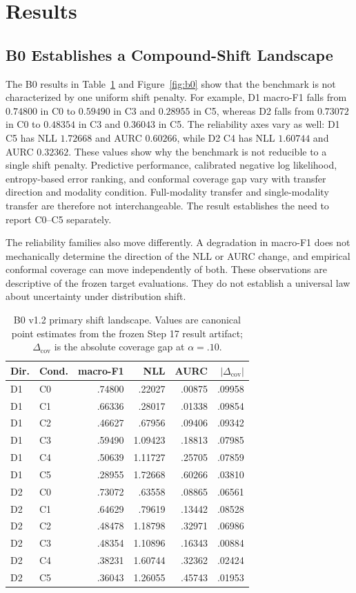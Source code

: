 \documentclass[11pt]{article}
\begin{document}
\section{Results}
\subsection{B0 Establishes a Compound-Shift Landscape}
The B0 results in Table~\ref{tab:b0} and Figure~\ref{fig:b0} show that the benchmark is not characterized by one uniform shift penalty. For example, D1 macro-F1 falls from $0.74800$ in C0 to $0.59490$ in C3 and $0.28955$ in C5, whereas D2 falls from $0.73072$ in C0 to $0.48354$ in C3 and $0.36043$ in C5. The reliability axes vary as well: D1 C5 has NLL $1.72668$ and AURC $0.60266$, while D2 C4 has NLL $1.60744$ and AURC $0.32362$. These values show why the benchmark is not reducible to a single shift penalty. Predictive performance, calibrated negative log likelihood, entropy-based error ranking, and conformal coverage gap vary with transfer direction and modality condition. Full-modality transfer and single-modality transfer are therefore not interchangeable. The result establishes the need to report C0--C5 separately.

The reliability families also move differently. A degradation in macro-F1 does not mechanically determine the direction of the NLL or AURC change, and empirical conformal coverage can move independently of both. These observations are descriptive of the frozen target evaluations. They do not establish a universal law about uncertainty under distribution shift.

\begin{table}[t]
\centering\scriptsize
\caption{B0 v1.2 primary shift landscape. Values are canonical point estimates from the frozen Step 17 result artifact; $\Delta_{\mathrm{cov}}$ is the absolute coverage gap at $\alpha=.10$.}
\label{tab:b0}
\begin{tabular}{llrrrr}
\toprule
Dir. & Cond. & macro-F1 & NLL & AURC & $|\Delta_{\mathrm{cov}}|$\\
\midrule
D1 & C0 & .74800 & .22027 & .00875 & .09958\\
D1 & C1 & .66336 & .28017 & .01338 & .09854\\
D1 & C2 & .46627 & .67956 & .09406 & .09342\\
D1 & C3 & .59490 & 1.09423 & .18813 & .07985\\
D1 & C4 & .50639 & 1.11727 & .25705 & .07859\\
D1 & C5 & .28955 & 1.72668 & .60266 & .03810\\
D2 & C0 & .73072 & .63558 & .08865 & .06561\\
D2 & C1 & .64629 & .79619 & .13442 & .08528\\
D2 & C2 & .48478 & 1.18798 & .32971 & .06986\\
D2 & C3 & .48354 & 1.10896 & .16343 & .00884\\
D2 & C4 & .38231 & 1.60744 & .32362 & .02424\\
D2 & C5 & .36043 & 1.26055 & .45743 & .01953\\
\bottomrule
\end{tabular}
\end{table}
\end{document}
